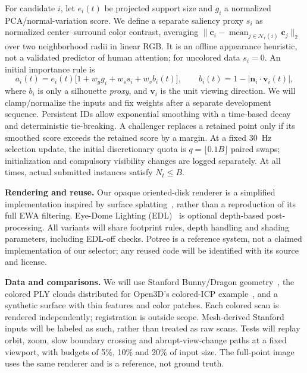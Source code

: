 \documentclass[a4paper]{article}
\begin{document}
For candidate $i$, let $e_i(t)$ be projected support size and $g_i$ a normalized PCA/normal-variation score. We define a separate saliency proxy $s_i$ as normalized center--surround color contrast, averaging $\|\mathbf c_i-\operatorname{mean}_{j\in\mathcal N_r(i)}\mathbf c_j\|_2$ over two neighborhood radii in linear RGB. It is an offline appearance heuristic, not a validated predictor of human attention; for uncolored data $s_i=0$. An initial importance rule is
\begin{equation}
 a_i(t)=e_i(t)\bigl[1+w_g g_i+w_s s_i+w_v b_i(t)\bigr],
 \qquad b_i(t)=1-|\mathbf n_i\cdot\mathbf v_i(t)|,
 \label{eq:score}
\end{equation}
where $b_i$ is only a silhouette \emph{proxy}, and $\mathbf v_i$ is the unit viewing direction. We will clamp/normalize the inputs and fix weights after a separate development sequence. Persistent IDs allow exponential smoothing with a time-based decay and deterministic tie-breaking. A challenger replaces a retained point only if its smoothed score exceeds the retained score by a margin. At a fixed 30~Hz selection update, the initial discretionary quota is $q=\lfloor0.1B\rfloor$ paired swaps; initialization and compulsory visibility changes are logged separately. At all times, actual submitted instances satisfy $N_t\le B$.

\textbf{Rendering and reuse.}
Our opaque oriented-disk renderer is a simplified implementation inspired by surface splatting~\cite{zwicker2001}, rather than a reproduction of its full EWA filtering. Eye-Dome Lighting (EDL)~\cite{edl2011} is optional depth-based post-processing. All variants will share footprint rules, depth handling and shading parameters, including EDL-off checks. Potree is a reference system, not a claimed implementation of our selector; any reused code will be identified with its source and license.

\textbf{Data and comparisons.}
We will use Stanford Bunny/Dragon geometry~\cite{stanford}, the colored PLY clouds distributed for Open3D's colored-ICP example~\cite{open3ddata}, and a synthetic surface with thin features and color patches. Each colored scan is rendered independently; registration is outside scope. Mesh-derived Stanford inputs will be labeled as such, rather than treated as raw scans. Tests will replay orbit, zoom, slow boundary crossing and abrupt-view-change paths at a fixed viewport, with budgets of 5\%, 10\% and 20\% of input size. The full-point image uses the same renderer and is a reference, not ground truth.
\end{document}
